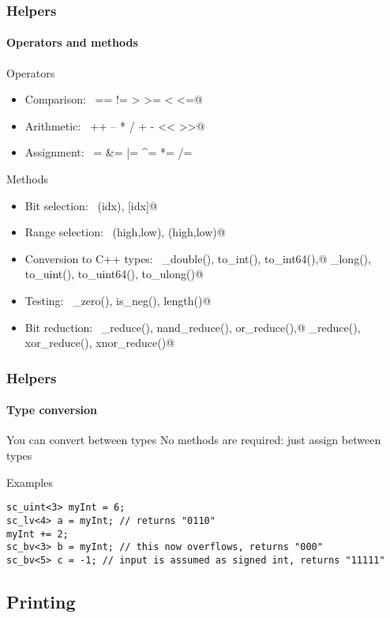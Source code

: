 \begin{frame}[fragile]
\frametitle{Helpers}
\framesubtitle{Operators and methods}
{\scriptsize 
\begin{block}{Operators}
\begin{itemize}
\item Comparison: \, \verb@== != > >= < <=@
\item Arithmetic: \, \verb@++ -- * / + - << >>@
\item Assignment: \, \verb@= &= |= ^=  *= /= %= += -= <<= >>=@
\end{itemize}
\end{block}
\pause
\begin{block}{Methods}
\begin{itemize}
\item Bit selection: \, \verb@bit(idx), [idx]@
\item Range selection: \, \verb@range(high,low), (high,low)@
\item Conversion to C++ types: \, \verb@to_double(), to_int(), to_int64(),@ \verb@to_long(), to_uint(), to_uint64(), to_ulong()@
\item Testing: \, \verb@is_zero(), is_neg(), length()@
\item Bit reduction: \, \verb@and_reduce(), nand_reduce(), or_reduce(),@ \verb@nor_reduce(), xor_reduce(), xnor_reduce()@
\end{itemize}
\end{block}
}
\end{frame}

\begin{frame}[fragile]
\frametitle{Helpers}
\framesubtitle{Type conversion}
{\scriptsize 
\begin{block}{You can convert between types}
No methods are required: just assign between types
\end{block}
\pause
\begin{block}{Examples}
\vspace{-1em}
\begin{verbatim}
sc_uint<3> myInt = 6;
sc_lv<4> a = myInt; // returns "0110"
myInt += 2;
sc_bv<3> b = myInt; // this now overflows, returns "000"
sc_bv<5> c = -1; // input is assumed as signed int, returns "11111" 
\end{verbatim}
\vspace{-1em}
\end{block}
}
\end{frame}

\subsection{Printing}

